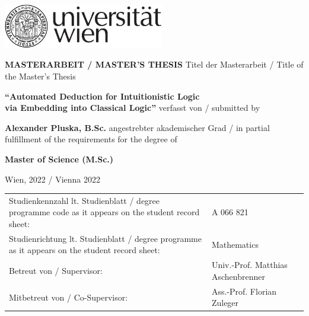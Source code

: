 \documentclass[a4paper,11pt]{report}
\theoremstyle{definition}
\theoremstyle{definition}
\theoremstyle{definition}
\theoremstyle{definition}
\theoremstyle{definition}
\theoremstyle{definition}
\theoremstyle{definition}
\begin{document}
	
	\begin{flushright}
		\includegraphics[width=7cm]{RZ_Logo_Uni_sw}
	\end{flushright}	
	\vskip20mm
	\begin{center}
		\huge\textbf{MASTERARBEIT / MASTER'S THESIS}
		\vskip15mm
		\normalsize{Titel der Masterarbeit / Title of the Master's Thesis}
		
		\LARGE\textbf{``Automated Deduction for Intuitionistic Logic\\via Embedding into Classical Logic''} %
		\vskip15mm
		\normalsize{verfasst von / submitted by}
		
		\Large\textbf{Alexander Pluska, B.Sc.} %
		\vskip15mm
		\normalsize{angestrebter akademischer Grad / in partial fulfillment of the requirements for the degree of}
		
		\Large\textbf{Master of Science (M.Sc.)}
		
		\small
	\end{center}
	\vskip15mm
	\begingroup
	\renewcommand{\arraystretch}{1.2}
	\begin{flushleft}
		Wien, 2022 / Vienna 2022 %
		\vfill
		\addtolength{\tabcolsep}{-6pt} 
		\begin{table}[h!]
			\begingroup
			\renewcommand*{\arraystretch}{1.2}
			\renewcommand\baselinestretch{1}
			\small
			\begin{tabular}{p{7cm} p{10cm}}
				Studienkennzahl lt. Studienblatt / \newline degree programme code as it appears on \newline the student record sheet: &A 066 821 \\
				Studienrichtung lt. Studienblatt / \newline degree programme as it appears on \newline the student record sheet:& Mathematics \\
				Betreut von / Supervisor: & Univ.-Prof. Matthias Aschenbrenner \\ %
				Mitbetreut von / Co-Supervisor: & Ass.-Prof. Florian Zuleger \\ 
			\end{tabular}
			\endgroup
		\end{table}
		\addtolength{\tabcolsep}{6pt} 
	\end{flushleft}	
	\endgroup	
	
\end{document}
